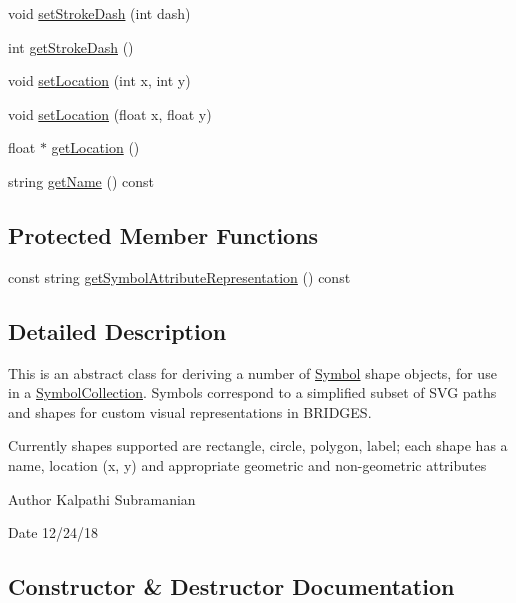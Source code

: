 \begin{DoxyCompactItemize}
\item 
void \hyperlink{classbridges_1_1_symbol_ab74d4afc6805db5be7613a82c7295c61}{set\+Stroke\+Dash} (int dash)
\item 
int \hyperlink{classbridges_1_1_symbol_aebd8935bc4f963a04412aa544beee27b}{get\+Stroke\+Dash} ()
\item 
void \hyperlink{classbridges_1_1_symbol_a9a1bdebb8dcec2871243a269e618a351}{set\+Location} (int x, int y)
\item 
void \hyperlink{classbridges_1_1_symbol_a5f774c3cbd407bc74d43e8d27bb6933f}{set\+Location} (float x, float y)
\item 
float $\ast$ \hyperlink{classbridges_1_1_symbol_a97f8b30d76dd0d8dd49167628bb3f810}{get\+Location} ()
\item 
string \hyperlink{classbridges_1_1_symbol_a68907c3cb353614a88063219d2a30c32}{get\+Name} () const 
\end{DoxyCompactItemize}
\subsection*{Protected Member Functions}
\begin{DoxyCompactItemize}
\item 
const string \hyperlink{classbridges_1_1_symbol_a45d8861619ac322e6ec08383a478c9d0}{get\+Symbol\+Attribute\+Representation} () const 
\end{DoxyCompactItemize}


\subsection{Detailed Description}
This is an abstract class for deriving a number of \hyperlink{classbridges_1_1_symbol}{Symbol} shape objects, for use in a \hyperlink{classbridges_1_1_symbol_collection}{Symbol\+Collection}. Symbols correspond to a simplified subset of S\+V\+G paths and shapes for custom visual representations in B\+R\+I\+D\+G\+E\+S. 

Currently shapes supported are rectangle, circle, polygon, label; each shape has a name, location (x, y) and appropriate geometric and non-\/geometric attributes

\begin{DoxyAuthor}{Author}
Kalpathi Subramanian 
\end{DoxyAuthor}
\begin{DoxyDate}{Date}
12/24/18 
\end{DoxyDate}


\subsection{Constructor \& Destructor Documentation}
\hypertarget{classbridges_1_1_symbol_a4e1ce195ffc6c99e7f597ef63ed40aa6}{}

